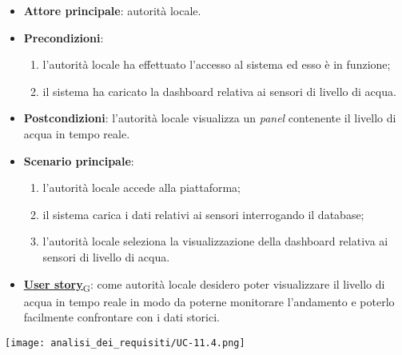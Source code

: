 \begin{itemize}
	\item \textbf{Attore principale}: autorità locale.
	\item \textbf{Precondizioni}:
	      \begin{enumerate}
		      \item l'autorità locale ha effettuato l'accesso al sistema ed esso è in funzione;
		      \item il sistema ha caricato la dashboard relativa ai sensori di livello di acqua.
	      \end{enumerate}
	\item \textbf{Postcondizioni}: l'autorità locale visualizza un \textit{panel} contenente il livello di acqua in tempo reale.
	\item \textbf{Scenario principale}:
	      \begin{enumerate}
		      \item l'autorità locale accede alla piattaforma;
		      \item il sistema carica i dati relativi ai sensori interrogando il database;
		      \item l'autorità locale seleziona la visualizzazione della dashboard relativa ai sensori di livello di acqua.
	      \end{enumerate}
	\item \href{https://7last.github.io/docs/rtb/documentazione-interna/glossario\#user-story}{\textbf{User story}\textsubscript{G}}:
	      come autorità locale desidero poter visualizzare il livello di acqua in tempo reale in modo da poterne monitorare l'andamento
	      e poterlo facilmente confrontare con i dati storici.
\end{itemize}
\begin{center}
	\texttt{[image: analisi\_dei\_requisiti/UC-11.4.png]}
\end{center}

